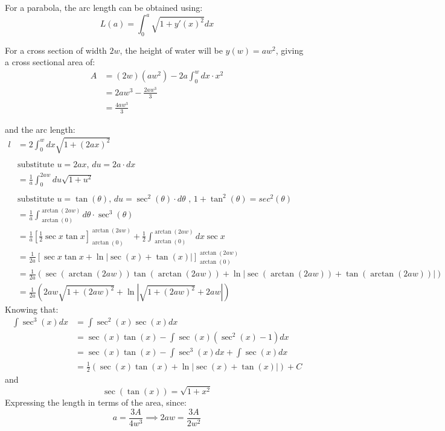 \documentclass[12pt]{article}
\begin{document}
For a parabola, the arc length can be obtained using:
\begin{equation}
    L(a) = \int_0^a\sqrt{1 + y'(x)^2}dx
\end{equation}

For a cross section of width $2w$, the height of water will be $y(w) = aw^2$, giving a cross sectional area of:
\begin{equation}
    \begin{split}
        A &= (2w)(aw^2) - 2a\int_0^w dx \cdot x^2
        \\ &=2aw^3 - \frac{2aw^3}{3}
        \\ &=\frac{4aw^3}{3}
    \end{split}
\end{equation}

and the arc length:
\begin{equation}
    \begin{split}
        l&=2\int_0^wdx\sqrt{1 + (2ax)^2}
        \\
        \\ &\text{substitute }u=2ax\text{, }du=2a\cdot dx
        \\&=\frac{1}{a}\int_0^{2aw}du\sqrt{1 + u^2}
        \\
        \\ &\text{substitute }u=\tan(\theta)\text{, }du=\sec^2(\theta)\cdot d\theta\text{ , }1 + \tan^2(\theta) = sec^2(\theta)
        \\&=\frac{1}{a}\int_{\arctan(0)}^{\arctan{(2aw)}} d\theta \cdot \sec^3(\theta)
        \\&=\frac{1}{a}\left[\frac{1}{2}\sec{x}\tan{x}\right]_{\arctan(0)}^{\arctan(2aw)}+ \frac{1}{2}\int_{\arctan(0)}^{\arctan(2aw)} dx\sec{x}
        \\&= \frac{1}{2a}\left[\sec{x}\tan{x} + \ln{|\sec(x)+\tan(x)|}\right]_{\arctan(0)}^{\arctan(2aw)}
        \\&= \frac{1}{2a}(\sec(\arctan(2aw))\tan(\arctan(2aw)) + \ln{|\sec(\arctan(2aw))+\tan(\arctan(2aw))|})
        \\&=\frac{1}{2a}(2aw\sqrt{1 + (2aw)^2}+ \ln{|\sqrt{1 + (2aw)^2} + 2aw|})
    \end{split}
\end{equation}
Knowing that:
\begin{equation}
    \begin{split}
         \int \sec^3(x)dx &= \int \sec^2(x)\sec(x)dx
         \\&=\sec(x)\tan(x)-\int\sec(x)(\sec^2(x)-1)dx
         \\&=\sec(x)\tan(x)-\int\sec^3(x)dx+\int\sec(x)dx
         \\&=\frac{1}{2}\left(\sec(x)\tan(x)+\ln{|\sec(x)+\tan(x)|}\right) + C
    \end{split}
\end{equation}
and
\begin{equation}
    \sec(\tan(x)) = \sqrt{1+x^2}
\end{equation}
Expressing the length in terms of the area, since:
\begin{equation}
    a = \frac{3A}{4w^3} \implies 2aw = \frac{3A}{2w^2}
\end{equation}
\end{document}
